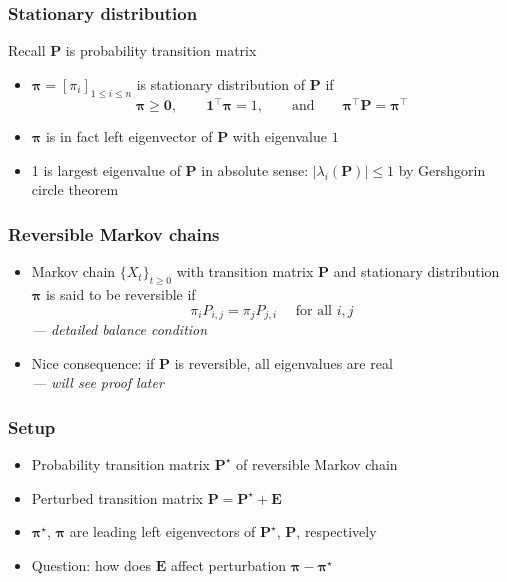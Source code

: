 \documentclass[compress,
mathserif,wide,%
]{beamer}
\begin{document}
\begin{frame}
	\frametitle{Stationary distribution}
	Recall $\bm{P}$ is probability transition matrix
	\begin{itemize}
		\item $\bm{\pi}=[\pi_i]_{1\leq i\leq n}$ is stationary distribution of $\bm{P}$ if 
		\begin{equation*}
\bm{\pi}\geq\bm{0},\qquad\bm{1}^{\top}\bm{\pi}=1,\qquad\text{and}\qquad\bm{\pi}^{\top}\bm{P}=\bm{\pi}^{\top}
\end{equation*}
		\item $\bm{\pi}$ is in fact left eigenvector of $\bm{P}$ with eigenvalue $1$
		\item 1 is largest eigenvalue of $\bm{P}$ in absolute sense: $|\lambda_{i}(\bm{P})| \leq 1$ by Gershgorin circle theorem
	\end{itemize}
\end{frame}

\begin{frame}
	\frametitle{Reversible Markov chains}
	\begin{itemize}
		\item Markov chain $\{X_t\}_{t\geq 0}$ with transition matrix $\bm{P}$ and stationary distribution $\bm{\pi}$ is said to be \alert{reversible} if 
	\[
	\pi_{i} P_{i,j} = \pi_{j} P_{j,i} \quad \text{ for all } i, j
	\]
	{\hfill \em --- detailed balance condition}
	\item Nice consequence: if $\bm{P}$ is reversible, all eigenvalues are real \\
	{\hfill \em --- will see proof later}
	\end{itemize}
	
\end{frame}


\begin{frame}
	\frametitle{Setup}
	\begin{itemize}
		\item Probability transition matrix $\bm{P}^{\star}$ of reversible Markov chain
		\item Perturbed transition matrix $\bm{P}=\bm{P}^{\star}+\bm{E}$
		\item $\bm{\pi}^\star$, $\bm{\pi}$ are leading left eigenvectors of $\bm{P}^{\star}$, $\bm{P}$, respectively
		\item Question: how does $\bm{E}$ affect perturbation $\bm{\pi} - \bm{\pi}^{\star}$
	\end{itemize}

\end{frame}
\end{document}
